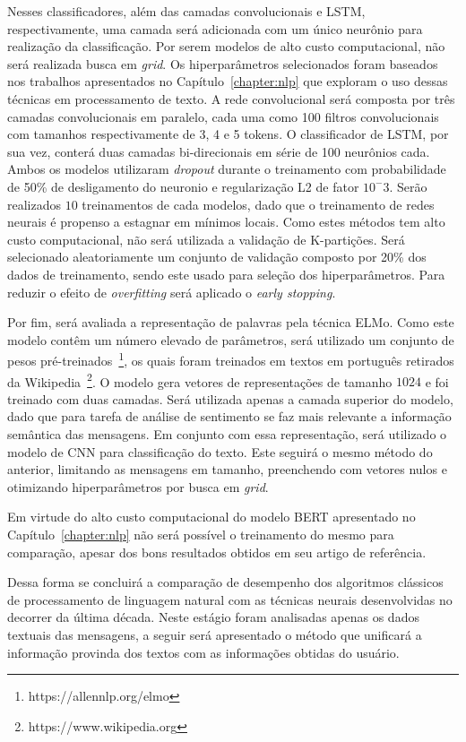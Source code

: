 Nesses classificadores, além das camadas convolucionais e LSTM, respectivamente,
uma camada será adicionada com um único neurônio para realização da
classificação.
Por serem modelos de alto custo computacional, não será realizada busca em
\textit{grid}.
Os hiperparâmetros selecionados foram baseados nos trabalhos apresentados no
Capítulo~\ref{chapter:nlp} que exploram o uso dessas técnicas em processamento
de texto.
A rede convolucional será composta por três camadas convolucionais em paralelo,
cada uma como 100 filtros convolucionais com tamanhos respectivamente de 3, 4 e
5 tokens.
O classificador de LSTM, por sua vez, conterá duas camadas bi-direcionais em
série de 100 neurônios cada.
Ambos os modelos utilizaram \textit{dropout} durante o treinamento com
probabilidade de 50\% de desligamento do neuronio e regularização L2 de fator
$10^-3$.
Serão realizados $10$ treinamentos de cada modelos, dado que o treinamento de
redes neurais é propenso a estagnar em mínimos locais.
Como estes métodos tem alto custo computacional, não será utilizada a validação
de K-partições.
Será selecionado aleatoriamente um conjunto de validação composto por 20\% dos
dados de treinamento, sendo este usado para seleção dos hiperparâmetros.
Para reduzir o efeito de \textit{overfitting} será aplicado o \textit{early
stopping}.

Por fim, será avaliada a representação de palavras pela técnica ELMo.
Como este modelo contêm um número elevado de parâmetros, será utilizado um
conjunto de pesos pré-treinados~\footnote{https://allennlp.org/elmo}, os quais
foram treinados em textos em português retirados da
Wikipedia~\footnote{https://www.wikipedia.org}.
O modelo gera vetores de representações de tamanho $1024$ e foi treinado com
duas camadas.
Será utilizada apenas a camada superior do modelo, dado que para tarefa de
análise de sentimento se faz mais relevante a informação semântica das mensagens.
Em conjunto com essa representação, será utilizado o modelo de CNN para
classificação do texto.
Este seguirá o mesmo método do anterior, limitando as mensagens em tamanho,
preenchendo com vetores nulos e otimizando hiperparâmetros por busca em
\textit{grid}.

Em virtude do alto custo computacional do modelo BERT apresentado no
Capítulo~\ref{chapter:nlp} não será possível o treinamento do mesmo para
comparação, apesar dos bons resultados obtidos em seu artigo de referência.

Dessa forma se concluirá a comparação de desempenho dos algoritmos clássicos
de processamento de linguagem natural com as técnicas neurais desenvolvidas no
decorrer da última década.
Neste estágio foram analisadas apenas os dados textuais das mensagens, a seguir
será apresentado o método que unificará a informação provinda dos textos com as
informações obtidas do usuário.

